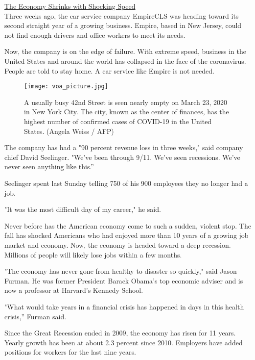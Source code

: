 \href{https://www.51voa.com/VOA_Special_English/the-economy-shrinks-with-shocking-speed-84171.html}{The Economy Shrinks with Shocking Speed} \\

Three weeks ago, the car service company EmpireCLS was heading toward its second straight year of a growing business. Empire, based in New Jersey, could not find enough drivers and office workers to meet its needs.

Now, the company is on the edge of failure.
With extreme speed, business in the United States and around the world has collapsed in the face of the coronavirus. People are told to stay home. A car service like Empire is not needed.

\begin{figure}[h] %
    \texttt{[image: voa\_picture.jpg]}
    \caption{A usually busy 42nd Street is seen nearly empty on March 23, 2020 in New York City. The city, known as the center of finances, has the highest number of confirmed cases of COVID-19 in the United States. (Angela Weiss / AFP)}
\end{figure}

The company has had a "90 percent revenue loss in three weeks," said company chief David Seelinger. "We've been through 9/11. We've seen recessions. We've never seen anything like this.''

Seelinger spent last Sunday telling 750 of his 900 employees they no longer had a job.

"It was the most difficult day of my career," he said.

Never before has the American economy come to such a sudden, violent stop. The fall has shocked Americans who had enjoyed more than 10 years of a growing job market and economy. Now, the economy is headed toward a deep recession. Millions of people will likely lose jobs within a few months.

"The economy has never gone from healthy to disaster so quickly," said Jason Furman. He was former President Barack Obama's top economic adviser and is now a professor at Harvard's Kennedy School.

"What would take years in a financial crisis has happened in days in this health crisis,'' Furman said.

Since the Great Recession ended in 2009, the economy has risen for 11 years. Yearly growth has been at about 2.3 percent since 2010. Employers have added positions for workers for the last nine years.

